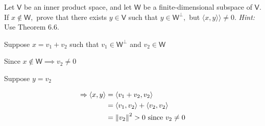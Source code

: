 Let $\mathsf{V}$ be an inner product space, and let $\mathsf{W}$ be a
finite-dimensional subspace of $\mathsf{V}.$ If $x \notin \mathsf{W},$
prove that there exists $y \in \mathsf{V}$ such that $y \in
\mathsf{W}^\perp,$ but $\langle x,y \rangle\rangle \neq 0.$ {\it
  Hint:} Use Theorem 6.6.

Suppose $x = v_1 + v_2$ such that $v_1 \in \mathsf{W}^\perp$ and $v_2
\in \mathsf{W}$

Since $x \notin \mathsf{W} \implies v_2 \neq 0$

Suppose $y = v_2$

\begin{align}
\Rightarrow \langle x,y \rangle &= \langle v_1 + v_2,v_2 \rangle\\
&= \langle v_1,v_2 \rangle + \langle v_2,v_2 \rangle\\
&= \left\lVert v_2\right\rVert^2  > 0 \text{ since } v_2 \neq 0
\end{align}
